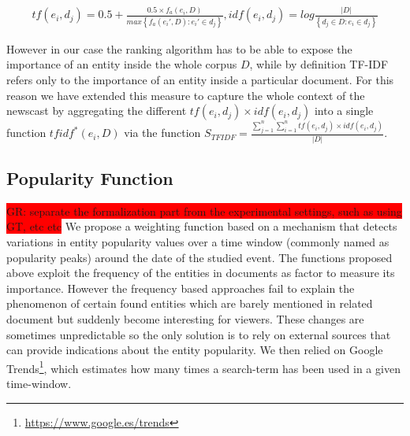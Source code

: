\documentclass{llncs}
\newcommand{\todo}[1]{\colorbox{red}{#1}}
\begin{document}
\begin{equation}
\begin{matrix}
tf(e_i,d_j) = 0.5 + \frac{0.5\times f_{a}(e_i,D)}{max\left \{ f_{a}(e_i',D) : e_i' \in d_j\right \}},   idf(e_i,d_j) = log\frac{\left | D \right |}{\left \{ d_j\in D  :  e_i\in d_j \right \}}
\end{matrix}
\end{equation}

However in our case the ranking algorithm has to be able to expose the importance of an entity inside the whole corpus $D$, while by definition TF-IDF refers only to the importance of an entity inside a particular document. 
For this reason we have extended this measure to capture the whole context of the newscast by aggregating the different $tf(e_i,d_j) \times idf(e_i,d_j)$ into a single function $tfidf^{*}(e_i,D)$ via the function $S_{TFIDF}= \frac{ \sum_{j=1}^{n} \sum_{i=1}^{n} tf(e_i,d_j) \times idf(e_i,d_j)} {|D|}$.


\subsection{Popularity Function}
\todo{GR: separate the formalization part from the experimental settings, such as using GT, etc etc}
We propose a weighting function based on a mechanism that detects variations in entity popularity values over a time window (commonly named as popularity peaks) around the date of the studied event. The functions proposed above exploit the frequency of the entities in documents as factor to measure its importance. However the frequency based approaches fail to explain the phenomenon of certain found entities which are barely mentioned in related document but suddenly become interesting for viewers. These changes are sometimes unpredictable so the only solution is to rely on external sources that can provide indications about the entity popularity. We then relied on Google Trends\footnote{\url{https://www.google.es/trends}}, which estimates how many times a search-term has been used in a given time-window.
\end{document}
